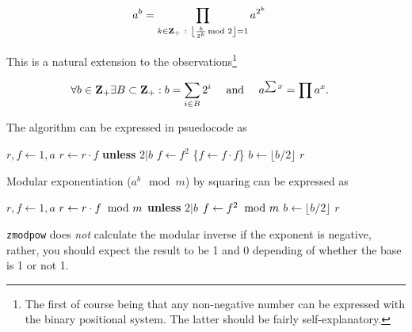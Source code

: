 \vspace{-1em}
\[ \hspace*{-0.4cm}
    a^b =
    \prod_{k \in \textbf{Z}_{+} ~:~ \left \lfloor \frac{b}{2^k} \hspace*{-1ex} \mod 2 \right \rfloor = 1}
    a^{2^k}
\]

\noindent
This is a natural extension to the
observations\footnote{The first of course being
that any non-negative number can be expressed
with the binary positional system. The latter
should be fairly self-explanatory.}

\vspace{-1em}
\[ \hspace*{-0.4cm}
    \forall b \in \textbf{Z}_{+} \exists B \subset \textbf{Z}_{+} : b = \sum_{i \in B} 2^i
    ~~~~ \textrm{and} ~~~~
    a^{\sum x} = \prod a^x.
\]

\noindent
The algorithm can be expressed in psuedocode as

\vspace{1em}
\hspace{-2.8ex}
\begin{minipage}{\linewidth}
\begin{algorithmic}
    \STATE $r, f \gets 1, a$
      \STATE $r \gets r \cdot f$ {\bf unless} $2 \vert b$
      \STATE $f \gets f^2$ \textcolor{c}{\{$f \gets f \cdot f$\}}
      \STATE $b \gets \lfloor b / 2 \rfloor$
    \ENDWHILE
    \RETURN $r$ 
\end{algorithmic}
\end{minipage}
\vspace{1em}

\noindent
Modular exponentiation ($a^b \mod m$) by squaring can be
expressed as

\vspace{1em}
\hspace{-2.8ex}
\begin{minipage}{\linewidth}
\begin{algorithmic}
    \STATE $r, f \gets 1, a$
      \STATE $r \gets r \cdot f \hspace*{-1ex}~ \mod m$ \textbf{unless} $2 \vert b$
      \STATE $f \gets f^2 \hspace*{-1ex}~ \mod m$
      \STATE $b \gets \lfloor b / 2 \rfloor$
    \ENDWHILE
    \RETURN $r$ 
\end{algorithmic}
\end{minipage}
\vspace{1em}

{\tt zmodpow} does \emph{not} calculate the
modular inverse if the exponent is negative,
rather, you should expect the result to be
1 and 0 depending of whether the base is 1
or not 1.


